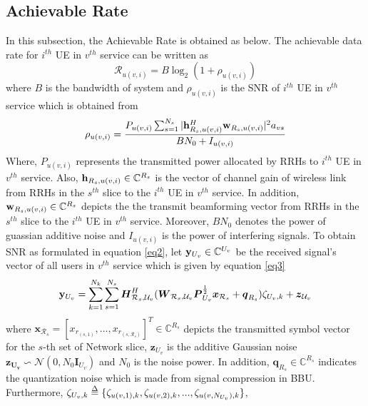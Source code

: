 \documentclass[conference]{IEEEtran}
\def\delequal{\mathrel{\ensurestackMath{\stackon[1pt]{=}{\scriptstyle\Delta}}}}
\begin{document}
\subsection{Achievable Rate}
In this subsection, the Achievable Rate is obtained as below.
The achievable data rate for $i^{th}$ UE in $v^{th}$ service can be written as 
\begin{equation}\label{eq1}
\mathcal{R}_{u(v,i)} = B \log_2({1+ \rho_{u(v,i)}})
\end{equation}
where $B$ is the bandwidth of system and $\rho_{u(v,i)}$ is the SNR of $i^{th}$ UE in $v^{th}$ service which is obtained from 
\begin{equation}\label{eq2}
\rho_{u(v,i)} =  \frac{P_{u(v,i)}\sum_{s=1}^{N_s}|\bold{h}_{R_s,u(v,i)}^H \bold{w}_{R_s,u(v,i)}|^2 a_{vs}}{BN_0 + I_{u(v,i)}}
\end{equation}
Where, $P_{u(v,i)}$ represents the transmitted power allocated by RRHs to $i^{th}$ UE in $v^{th}$ service. Also, 
$\bold{h}_{R_s,u(v,i)} \in \mathbb{C}^{{R}_s}$ is the vector of channel gain of wireless link from RRHs in the $s^{th}$ slice to the $i^{th}$ UE in $v^{th}$ service. In addition, $\bold{w}_{R_s,u(v,i)} \in \mathbb{C}^{{R}_s}$ depicts the the transmit beamforming vector from RRHs in the $s^{th}$ slice to the $i^{th}$ UE in $v^{th}$ service. Moreover, $BN_0$ denotes the power of guassian additive noise and $I_{u(v,i)}$ is the power of interfering signals. 
To obtain SNR as formulated in equation \eqref{eq2}, let $\bold{y}_{U_v}\in \mathbb{C}^{U_v} $ be the received signal's vector of all users in $v^{th}$ service which is given by equation \eqref{eq3}
\begin{equation}\label{eq3}
\bold{y}_{U_v} = \sum_{k=1}^{N_k}\sum_{s = 1}^{N_s} \boldsymbol{H}^H_{\mathcal{R}_s,\mathcal{U}_v}(\boldsymbol{W}_{\mathcal{R}_s,\mathcal{U}_v}\boldsymbol{P}_{U_v}^{\frac{1}{2}}\boldsymbol{x}_{\mathcal{R}_s}+ \boldsymbol{q}_{R_s}) \zeta_{U_v,k}+ \boldsymbol{z}_{\mathcal{U}_v}
\end{equation}
where $\boldsymbol{x}_{ \mathcal{R}_s} = [x_{ r_{(s,1)}},...,x_{ r_{(s,\mathcal{R}_s)}}]^T \in \mathbb{C}^{{R}_s } $ depicts the transmitted symbol vector for the $s$-th set of Network slice,  $\boldsymbol{z}_{U_v}$ is the additive Gaussian noise $\boldsymbol{z_{U_v}} \backsim \mathcal{N}(0,N_0\boldsymbol{I}_{{U}_v})$ and $N_0$ is the noise power.
In addition, $\boldsymbol{q}_{R_s} \in \mathbb{C}^{{R}_s }  $ indicates the quantization noise which is made from signal compression in BBU.
\\
Furthermore, $\zeta_{U_v,k} \delequal \{\zeta_{u(v,1),k},\zeta_{u(v,2),k},...,\zeta_{u(v,N_{U_v}),k}\}$,
\end{document}
